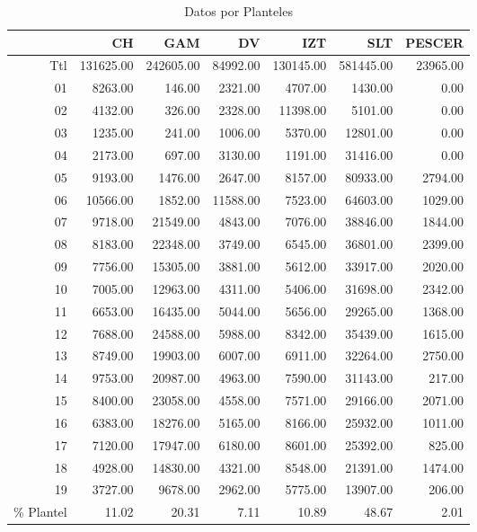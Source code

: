 \documentclass[12pt]{article}
\begin{document}
\begin{table}[ht]
\centering
\caption{Datos por Planteles} 
\begin{tabular}{rrrrrrr}
  \hline
 & CH & GAM & DV & IZT & SLT & PESCER \\ 
  \hline
Ttl & 131625.00 & 242605.00 & 84992.00 & 130145.00 & 581445.00 & 23965.00 \\ 
  01 & 8263.00 & 146.00 & 2321.00 & 4707.00 & 1430.00 & 0.00 \\ 
  02 & 4132.00 & 326.00 & 2328.00 & 11398.00 & 5101.00 & 0.00 \\ 
  03 & 1235.00 & 241.00 & 1006.00 & 5370.00 & 12801.00 & 0.00 \\ 
  04 & 2173.00 & 697.00 & 3130.00 & 1191.00 & 31416.00 & 0.00 \\ 
  05 & 9193.00 & 1476.00 & 2647.00 & 8157.00 & 80933.00 & 2794.00 \\ 
  06 & 10566.00 & 1852.00 & 11588.00 & 7523.00 & 64603.00 & 1029.00 \\ 
  07 & 9718.00 & 21549.00 & 4843.00 & 7076.00 & 38846.00 & 1844.00 \\ 
  08 & 8183.00 & 22348.00 & 3749.00 & 6545.00 & 36801.00 & 2399.00 \\ 
  09 & 7756.00 & 15305.00 & 3881.00 & 5612.00 & 33917.00 & 2020.00 \\ 
  10 & 7005.00 & 12963.00 & 4311.00 & 5406.00 & 31698.00 & 2342.00 \\ 
  11 & 6653.00 & 16435.00 & 5044.00 & 5656.00 & 29265.00 & 1368.00 \\ 
  12 & 7688.00 & 24588.00 & 5988.00 & 8342.00 & 35439.00 & 1615.00 \\ 
  13 & 8749.00 & 19903.00 & 6007.00 & 6911.00 & 32264.00 & 2750.00 \\ 
  14 & 9753.00 & 20987.00 & 4963.00 & 7590.00 & 31143.00 & 217.00 \\ 
  15 & 8400.00 & 23058.00 & 4558.00 & 7571.00 & 29166.00 & 2071.00 \\ 
  16 & 6383.00 & 18276.00 & 5165.00 & 8166.00 & 25932.00 & 1011.00 \\ 
  17 & 7120.00 & 17947.00 & 6180.00 & 8601.00 & 25392.00 & 825.00 \\ 
  18 & 4928.00 & 14830.00 & 4321.00 & 8548.00 & 21391.00 & 1474.00 \\ 
  19 & 3727.00 & 9678.00 & 2962.00 & 5775.00 & 13907.00 & 206.00 \\ 
  \% Plantel & 11.02 & 20.31 & 7.11 & 10.89 & 48.67 & 2.01 \\ 
   \hline
\end{tabular}
\end{table}
\end{document}
